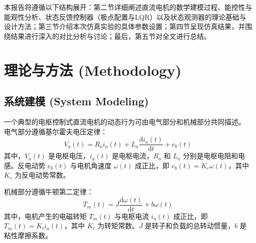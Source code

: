 \documentclass[12pt, a4paper]{article}
\begin{document}
本报告将遵循以下结构展开：第二节详细阐述直流电机的数学建模过程、能控性与能观性分析、状态反馈控制器（极点配置与LQR）以及状态观测器的理论基础与设计方法；第三节介绍本次仿真实验的具体参数设置；第四节呈现仿真结果，并围绕结果进行深入的对比分析与讨论；最后，第五节对全文进行总结。

\section{理论与方法 (Methodology)}
\subsection{系统建模 (System Modeling)}
一个典型的电枢控制式直流电机的动态行为可由电气部分和机械部分共同描述。
电气部分遵循基尔霍夫电压定律：
\begin{equation}
    V_a(t) = R_a i_a(t) + L_a \frac{\mathrm{d}i_a(t)}{\mathrm{d}t} + e_b(t)
    \label{eq:kirchhoff_voltage}
\end{equation}
其中，$V_a(t)$ 是电枢电压，$i_a(t)$ 是电枢电流，$R_a$ 和 $L_a$ 分别是电枢电阻和电感。反电动势 $e_b(t)$ 与电机角速度 $\omega(t)$ 成正比，即 $e_b(t) = K_e \omega(t)$，其中 $K_e$ 为反电动势常数。

机械部分遵循牛顿第二定律：
\begin{equation}
    T_m(t) = J \frac{\mathrm{d}\omega(t)}{\mathrm{d}t} + b \omega(t)
    \label{eq:newton_law}
\end{equation}
其中，电机产生的电磁转矩 $T_m(t)$ 与电枢电流 $i_a(t)$ 成正比，即 $T_m(t) = K_t i_a(t)$，其中 $K_t$ 为转矩常数。$J$ 是转子和负载的总转动惯量，$b$ 是粘性摩擦系数。
\end{document}
